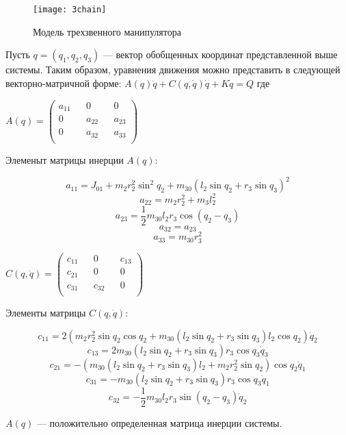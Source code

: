  \begin{figure}[h]
 	\centering
 	\texttt{[image: 3chain]}
 	\caption{Модель трехзвенного манипулятора}
 	\label{fig:manip1}
 \end{figure}
 
 Пусть $q=(q_1, q_2, q_3)$ --- вектор обобщенных координат представленной выше системы. Таким образом, уравнения движения можно представить в следующей векторно-матричной форме: $A(q) \ddot q + C(q, \dot q) \dot q + K \dot q = Q$ где 
 
 \vspace{5mm}
 
 $A(q) =
 \begin{pmatrix}
 a_{11} && 0 && 0  \\
 0  && a_{22} && a_{23} \\
 0 && a_{32} &&  a_{33}\\
 \end{pmatrix}$
 
 \vspace{5mm}
 
 Элеменыт матрицы инерции $A(q):$
 
 $$a_{11} = J_{01} + m_2 r_2^2 \sin^2 q_2 + m_{30} (l_2 \sin q_2 + r_3 \sin q_3)^2$$
 $$a_{22} = m_2 r_2^2 + m_3 l_2^2$$
 $$a_{23} = \frac12 m_{30} l_2 r_3 \cos(q_2 - q_3)$$
 $$a_{32} = a_{23}$$
 $$a_{33} = m_{30} r_3^2$$
 
 $C(q, \dot q)= 
 \begin{pmatrix}
 c_{11} && 0 && c_{13} \\
 c_{21} && 0 && 0 \\
 c_{31} && c_{32} && 0\\
 \end{pmatrix}$
 
 Элементы матрицы $C(q, \dot q):$
 
 $$c_{11} = 2 (m_2 r_2^2 \sin q_2 \cos q_2 + m_{30} (l_2 \sin q_2 + r_3 \sin q_3) l_2 \cos q_2) \dot q_2$$
 $$c_{13} = 2 m_{30} (l_2 \sin q_2 + r_3 \sin q_3) r_3 \cos q_3 \dot q_3$$
 $$c_{21} = - (m_{30} (l_2 \sin q_2 + r_3 \sin q_3) l_2 + m_2 r_2^2 \sin q_2) \cos q_2 \dot q_1$$
 $$c_{31} = - m_{30} (l_2 \sin q_2 + r_3 \sin q_3) r_3 \cos q_3 \dot q_1$$
 $$c_{32} = - \frac12 m_{30} l_2 r_3 \sin (q_2 - q_3) \dot q_2$$
 
 \vspace{5mm}
 
 $A(q)$ --- положительно определенная матрица инерции системы.
 
